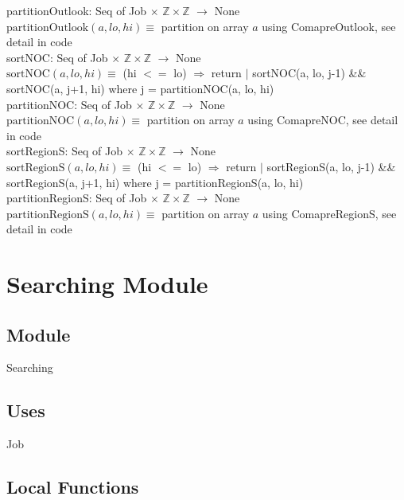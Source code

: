 \documentclass[12pt]{article}
\begin{document}
\noindent partitionOutlook: Seq of Job $\times$ $\mathbb{Z} \times \mathbb{Z}$ $ \rightarrow $ None\\
\noindent $\mbox{partitionOutlook}(a, lo, hi) \equiv$ partition on array $a$ using ComapreOutlook, see detail in code\\

\noindent sortNOC: Seq of Job $\times$ $\mathbb{Z} \times \mathbb{Z}$ $ \rightarrow $ None\\
\noindent $\mbox{sortNOC}(a, lo, hi) \equiv$ (hi $<=$ lo) $\Rightarrow$ return $|$ sortNOC(a, lo, j-1) \&\& sortNOC(a, j+1, hi) where j = partitionNOC(a, lo, hi)\\

\noindent partitionNOC: Seq of Job $\times$ $\mathbb{Z} \times \mathbb{Z}$ $ \rightarrow $ None\\
\noindent $\mbox{partitionNOC}(a, lo, hi) \equiv$ partition on array $a$ using ComapreNOC, see detail in code\\

\noindent sortRegionS: Seq of Job $\times$ $\mathbb{Z} \times \mathbb{Z}$ $ \rightarrow $ None\\
\noindent $\mbox{sortRegionS}(a, lo, hi) \equiv$ (hi $<=$ lo) $\Rightarrow$ return $|$ sortRegionS(a, lo, j-1) \&\& sortRegionS(a, j+1, hi) where j = partitionRegionS(a, lo, hi)\\

\noindent partitionRegionS: Seq of Job $\times$ $\mathbb{Z} \times \mathbb{Z}$ $ \rightarrow $ None\\
\noindent $\mbox{partitionRegionS}(a, lo, hi) \equiv$ partition on array $a$ using ComapreRegionS, see detail in code\\

\newpage
\section* {Searching Module}
\subsection*{Module}

Searching

\subsection* {Uses}

Job

\subsection*{Local Functions}
\end{document}
